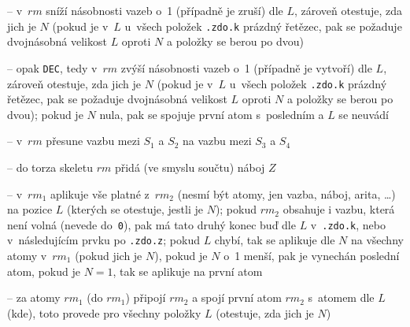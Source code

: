 \begin{itemize}

	 -- v~$rm$ sníží násobnosti vazeb o~1 (případně je
				zruší) dle $L$, zároveň otestuje, zda jich je $N$ (pokud je
				v~$L$ u~všech položek {\tt .zdo.k} prázdný řetězec, pak se
				požaduje dvojnásobná velikost $L$ oproti $N$ a položky se berou
				po dvou)


	 -- opak {\tt DEC}, tedy v~$rm$ zvýší násobnosti
				vazeb o~1 (případně je vytvoří) dle $L$, zároveň otestuje, zda
				jich je $N$ (pokud je v~$L$ u~všech položek {\tt .zdo.k} prázdný
				řetězec, pak se požaduje dvojnásobná velikost $L$ oproti $N$ a
				položky se berou po dvou); pokud je $N$ nula, pak se spojuje
				první atom s~posledním a $L$ se neuvádí


	 -- v~$rm$ přesune vazbu mezi
				$S_1$ a $S_2$ na vazbu mezi $S_3$ a $S_4$


	 -- do torza skeletu $rm$ přidá (ve smyslu součtu)
				náboj $Z$


	 -- v~$rm_1$ aplikuje vše platné
				z~$rm_2$ (nesmí být atomy, jen vazba, náboj, arita, \dots) na
				pozice $L$ (kterých se otestuje, jestli je $N$); pokud $rm_2$
				obsahuje i vazbu, která není volná (nevede do~{\tt 0}), pak má
				tato druhý konec buď dle $L$ v~{\tt .zdo.k}, nebo v~následujícím
				prvku po {\tt .zdo.z}; pokud $L$ chybí, tak se aplikuje dle $N$
				na všechny atomy v~$rm_1$ (pokud jich je $N$), pokud je $N$ o~1
				menší, pak je vynechán poslední atom, pokud je $N = 1$, tak se
				aplikuje na první atom


	 -- za atomy $rm_1$ (do $rm_1$) připojí
				$rm_2$ a spojí první atom $rm_2$ s~atomem dle $L$ (kde), toto
				provede pro všechny po\-lož\-ky $L$ (otestuje, zda jich je $N$)



\end{itemize}
